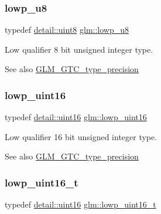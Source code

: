 \subsubsection{\texorpdfstring{lowp\+\_\+u8}{lowp\_u8}}
{\footnotesize\ttfamily typedef \mbox{\hyperlink{namespaceglm_1_1detail_aef2588f97d090cc19fbbe0c74fe17c8f}{detail\+::uint8}} \mbox{\hyperlink{group__gtc__type__precision_gae63f942c49a30dbf266b2f13f3efe257}{glm\+::lowp\+\_\+u8}}}

Low qualifier 8 bit unsigned integer type. \begin{DoxySeeAlso}{See also}
\mbox{\hyperlink{group__gtc__type__precision}{G\+L\+M\+\_\+\+G\+T\+C\+\_\+type\+\_\+precision}} 
\end{DoxySeeAlso}
\mbox{\label{group__gtc__type__precision_ga9b8409887319f62f06e664f6ca121b9d}} 
\subsubsection{\texorpdfstring{lowp\+\_\+uint16}{lowp\_uint16}}
{\footnotesize\ttfamily typedef \mbox{\hyperlink{namespaceglm_1_1detail_a47b2a7d006d187338e8031a352d1ce56}{detail\+::uint16}} \mbox{\hyperlink{group__gtc__type__precision_ga9b8409887319f62f06e664f6ca121b9d}{glm\+::lowp\+\_\+uint16}}}

Low qualifier 16 bit unsigned integer type. \begin{DoxySeeAlso}{See also}
\mbox{\hyperlink{group__gtc__type__precision}{G\+L\+M\+\_\+\+G\+T\+C\+\_\+type\+\_\+precision}} 
\end{DoxySeeAlso}
\mbox{\label{group__gtc__type__precision_ga9a71176a4e5bc61951f9e9197d9c80e1}} 
\subsubsection{\texorpdfstring{lowp\+\_\+uint16\+\_\+t}{lowp\_uint16\_t}}
{\footnotesize\ttfamily typedef \mbox{\hyperlink{namespaceglm_1_1detail_a47b2a7d006d187338e8031a352d1ce56}{detail\+::uint16}} \mbox{\hyperlink{group__gtc__type__precision_ga9a71176a4e5bc61951f9e9197d9c80e1}{glm\+::lowp\+\_\+uint16\+\_\+t}}}


